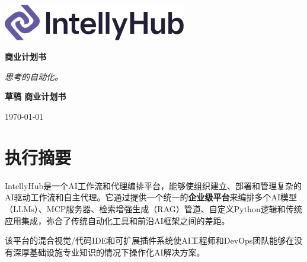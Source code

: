 \documentclass[11pt, a4paper, oneside]{article}
\begin{document}





\thispagestyle{empty} 
\begin{titlepage}
    \centering
    \vspace*{1cm}
    
    \includegraphics[width=0.6\textwidth]{IntellyHub_Logo_Colored.png}
    
    \vspace{2.5cm}
    
    {\Huge\bfseries\color{PrimaryColor}商业计划书}
    
    \vspace{1.5cm}
    
    {\Large\itshape\lightfont 思考的自动化。}
    
    \vfill %
    
    {\large\bfseries\color{PrimaryColor}草稿 \color{SecondaryColor}商业计划书}
    
    \vspace{0.5cm}
    
    {\large \today}
    
\end{titlepage}

\tableofcontents
\newpage


\section{执行摘要}
IntellyHub是一个AI工作流和代理编排平台，能够使组织建立、部署和管理复杂的AI驱动工作流和自主代理。它通过提供一个统一的\textbf{企业级平台}来编排多个AI模型（LLMs）、MCP服务器、检索增强生成（RAG）管道、自定义Python逻辑和传统应用集成，弥合了传统自动化工具和前沿AI框架之间的差距。

该平台的混合视觉/代码IDE和可扩展插件系统使AI工程师和DevOps团队能够在没有深厚基础设施专业知识的情况下操作化AI解决方案。
\end{document}
